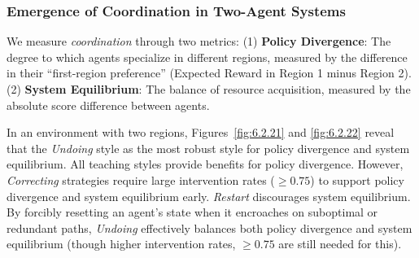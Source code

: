 \documentclass[10pt,letterpaper]{article}
\begin{document}
\subsubsection{Emergence of Coordination in Two-Agent Systems}
We measure \textit{coordination} through two metrics: 
(1) \textbf{Policy Divergence}: The degree to which agents specialize in different regions, measured by the difference in their ``first-region preference'' (Expected Reward in Region 1 minus Region 2).
(2) \textbf{System Equilibrium}: The balance of resource acquisition, measured by the absolute score difference between agents.

In an environment with two regions, Figures~\ref{fig:6.2.21} and \ref{fig:6.2.22} reveal that the \textit{Undoing} style as the most robust style for policy divergence and system equilibrium.  All teaching styles provide benefits for policy divergence. However, \textit{Correcting} strategies require large intervention rates ($\geq0.75$) to support policy divergence and system equilibrium early. \textit{Restart} discourages system equilibrium.  By forcibly resetting an agent's state when it encroaches on suboptimal or redundant paths, \textit{Undoing} effectively balances both policy divergence and system equilibrium (though higher intervention rates, $\geq0.75$ are still needed for this).


\end{document}
